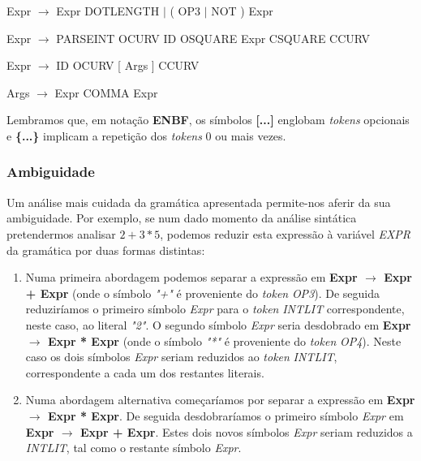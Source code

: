 \documentclass[11pt,a4paper]{article}
\begin{document}
\hspace{-1cm}Expr $\rightarrow$ Expr DOTLENGTH $\mid$ ( OP3 $\mid$ NOT ) Expr

\hspace{-1cm}Expr $\rightarrow$ PARSEINT OCURV ID OSQUARE Expr CSQUARE CCURV

\hspace{-1cm}Expr $\rightarrow$ ID OCURV [ Args ] CCURV

\hspace{-1cm}Args $\rightarrow$ Expr { COMMA Expr }

\vspace{0.5cm}

Lembramos que, em notação \textbf{ENBF}, os símbolos \textbf{[...]} englobam \emph{tokens} opcionais e \textbf{\{...\}} implicam a repetição dos \emph{tokens} 0 ou mais vezes.

\subsubsection{Ambiguidade}

Um análise mais cuidada da gramática apresentada permite-nos aferir da sua ambiguidade. Por exemplo, se num dado momento da análise sintática pretendermos analisar $2+3*5$, podemos reduzir esta expressão à variável \emph{EXPR} da gramática por duas formas distintas:

\begin{enumerate}
\item Numa primeira abordagem podemos separar a expressão em \textbf{Expr $\rightarrow$ Expr + Expr} (onde o símbolo \emph{"+"} é proveniente do \emph{token} \emph{OP3}). De seguida reduziríamos o primeiro símbolo \emph{Expr} para o \emph{token} \emph{INTLIT} correspondente, neste caso, ao literal \emph{"2"}. O segundo símbolo \emph{Expr} seria desdobrado em \textbf{Expr $\rightarrow$ Expr * Expr} (onde o símbolo \emph{"*"} é proveniente do \emph{token} \emph{OP4}). Neste caso os dois símbolos \emph{Expr} seriam reduzidos ao \emph{token} \emph{INTLIT}, correspondente a cada um dos restantes literais.

\item Numa abordagem alternativa começaríamos por separar a expressão em \textbf{Expr $\rightarrow$ Expr * Expr}. De seguida desdobraríamos o primeiro símbolo \emph{Expr} em \textbf{Expr $\rightarrow$ Expr + Expr}. Estes dois novos símbolos \emph{Expr} seriam reduzidos a \emph{INTLIT}, tal como o restante símbolo \emph{Expr}.
\end{enumerate}
\end{document}
